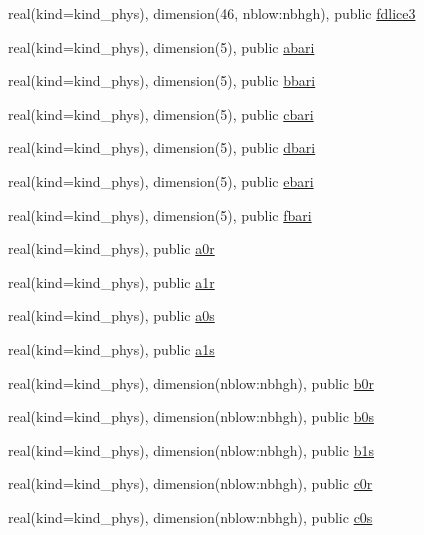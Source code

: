 \begin{DoxyCompactItemize}
\item 
real(kind=kind\+\_\+phys), dimension(46, nblow\+:nbhgh), public \hyperlink{namespacemodule__radsw__cldprtb_aa42cf6596d2dcd887864b1de40da3293}{fdlice3}
\item 
real(kind=kind\+\_\+phys), dimension(5), public \hyperlink{namespacemodule__radsw__cldprtb_ace960bbbf15ab3cadbee76301ff111dd}{abari}
\item 
real(kind=kind\+\_\+phys), dimension(5), public \hyperlink{namespacemodule__radsw__cldprtb_ad5342321ccd4759cb70f7a673620ee19}{bbari}
\item 
real(kind=kind\+\_\+phys), dimension(5), public \hyperlink{namespacemodule__radsw__cldprtb_ae7f1de5c9736894ac7b54c0e0d312f16}{cbari}
\item 
real(kind=kind\+\_\+phys), dimension(5), public \hyperlink{namespacemodule__radsw__cldprtb_af8b02590603ea2f838d954cb0a93bbeb}{dbari}
\item 
real(kind=kind\+\_\+phys), dimension(5), public \hyperlink{namespacemodule__radsw__cldprtb_a3cc7ab844ca564bd3df02a687bbc2f43}{ebari}
\item 
real(kind=kind\+\_\+phys), dimension(5), public \hyperlink{namespacemodule__radsw__cldprtb_ac2e5b61aea6effe7d49586bf5223c154}{fbari}
\item 
real(kind=kind\+\_\+phys), public \hyperlink{namespacemodule__radsw__cldprtb_a0fdb9425031a10735e11d7f5c9e0376e}{a0r}
\item 
real(kind=kind\+\_\+phys), public \hyperlink{namespacemodule__radsw__cldprtb_a9826a0616c434620200ce4652b5af800}{a1r}
\item 
real(kind=kind\+\_\+phys), public \hyperlink{namespacemodule__radsw__cldprtb_a81ba576e28e5844772d040ff7543faae}{a0s}
\item 
real(kind=kind\+\_\+phys), public \hyperlink{namespacemodule__radsw__cldprtb_a9bf8de06b96c5014ca7f21fd39d84257}{a1s}
\item 
real(kind=kind\+\_\+phys), dimension(nblow\+:nbhgh), public \hyperlink{namespacemodule__radsw__cldprtb_ac39d49e73ffa960421e36e45a35db162}{b0r}
\item 
real(kind=kind\+\_\+phys), dimension(nblow\+:nbhgh), public \hyperlink{namespacemodule__radsw__cldprtb_a391fbdda62f6fba95e105c2041e16880}{b0s}
\item 
real(kind=kind\+\_\+phys), dimension(nblow\+:nbhgh), public \hyperlink{namespacemodule__radsw__cldprtb_a2d2296e76fb85b66bd4583bcb9fa271b}{b1s}
\item 
real(kind=kind\+\_\+phys), dimension(nblow\+:nbhgh), public \hyperlink{namespacemodule__radsw__cldprtb_a8927b6e7cc810301e3843eb0f5c0c795}{c0r}
\item 
real(kind=kind\+\_\+phys), dimension(nblow\+:nbhgh), public \hyperlink{namespacemodule__radsw__cldprtb_aab7693c5f31ce2182bca61aff77996bc}{c0s}
\end{DoxyCompactItemize}


